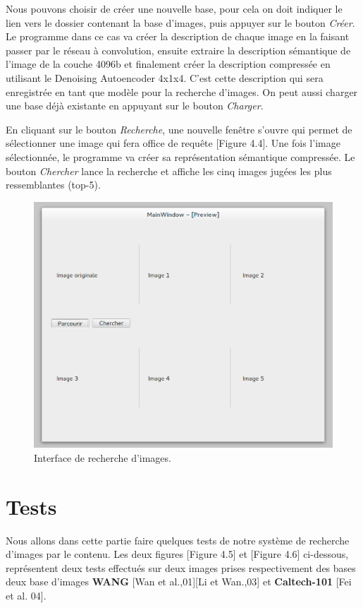 	Nous pouvons choisir de créer une nouvelle base, pour cela on doit indiquer le lien vers le dossier contenant la base d'images, puis appuyer sur le bouton \textit{Créer}. Le programme dans ce cas va créer la description de chaque image en la faisant passer par le réseau à convolution, ensuite extraire la description sémantique de l'image de la couche 4096b et finalement créer la description compressée en utilisant le Denoising Autoencoder 4x1x4.
	C'est cette description qui sera enregistrée en tant que modèle pour la recherche d'images. On peut aussi charger une base déjà existante en appuyant sur le bouton \textit{Charger}.

	En cliquant sur le bouton \textit{Recherche}, une nouvelle fenêtre s'ouvre qui permet de sélectionner une image qui fera office de requête [Figure 4.4]. Une fois l'image sélectionnée, le programme va créer sa représentation sémantique compressée. Le bouton \textit{Chercher} lance la recherche et affiche les cinq images jugées les plus ressemblantes (top-5).

\begin{figure}[H]
	\centering
		\includegraphics[width=4.5in]{Figures/search.png}
	\caption[]{Interface de recherche d'images.}
	\label{fig:Electron}
\end{figure}

\section{Tests}

	Nous allons dans cette partie faire quelques tests de notre système de recherche d'images par le contenu. Les deux figures [Figure 4.5] et [Figure 4.6] ci-dessous, représentent deux tests effectués sur deux images prises respectivement des bases deux base d'images \textbf{WANG} [Wan et al.,01][Li et Wan.,03] et \textbf{Caltech-101} [Fei et al. 04].
	
